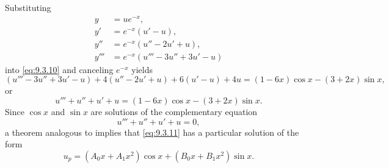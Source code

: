 \begin{solution}
Substituting
\begin{align*}
y&=ue^{-x},\\
y'&=e^{-x}(u'-u),\\
y''&=e^{-x}(u''-2u'+u),\\
y'''&=e^{-x}(u'''-3u''+3u'-u)
\end{align*}
into \eqref{eq:9.3.10} and canceling $e^{-x}$ yields
\[
(u'''-3u''+3u'-u)+4(u''-2u'+u)+6(u'-u)+4u
=(1-6x)\cos x-(3+2x)\sin x,
\]
or
\begin{equation} \label{eq:9.3.11}
u'''+u''+u'+u=(1-6x)\cos x-(3+2x)\sin x.
\end{equation}
Since $\cos x$ and $\sin x$ are  solutions of the complementary
equation
\[
u'''+u''+u'+u=0,
\]
a theorem analogous to  implies
that  \eqref{eq:9.3.11} has a particular solution of the form
\begin{equation} \label{eq:9.3.12}
u_p=(A_0x+A_1x^2)\cos x+(B_0x+B_1x^2)\sin x.
\end{equation}


\end{solution}
